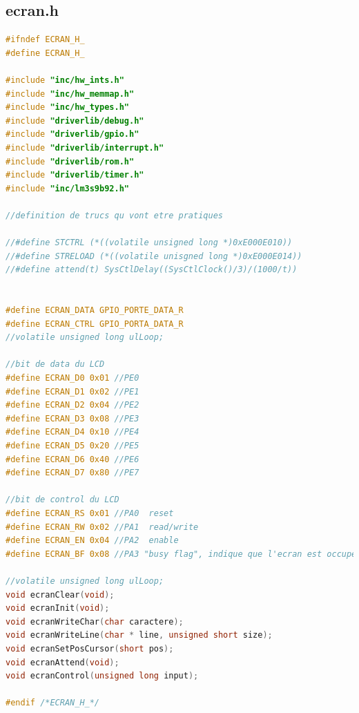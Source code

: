 \subsection{ecran.h}
\begin{lstlisting}[language=C]
#ifndef ECRAN_H_
#define ECRAN_H_

#include "inc/hw_ints.h"
#include "inc/hw_memmap.h"
#include "inc/hw_types.h"
#include "driverlib/debug.h"
#include "driverlib/gpio.h"
#include "driverlib/interrupt.h"
#include "driverlib/rom.h"
#include "driverlib/timer.h"
#include "inc/lm3s9b92.h"

//definition de trucs qu vont etre pratiques

//#define STCTRL (*((volatile unsigned long *)0xE000E010))
//#define STRELOAD (*((volatile unisgned long *)0xE000E014))
//#define attend(t) SysCtlDelay((SysCtlClock()/3)/(1000/t))


#define ECRAN_DATA GPIO_PORTE_DATA_R
#define ECRAN_CTRL GPIO_PORTA_DATA_R
//volatile unsigned long ulLoop;
	
//bit de data du LCD
#define ECRAN_D0 0x01 //PE0
#define ECRAN_D1 0x02 //PE1
#define ECRAN_D2 0x04 //PE2
#define ECRAN_D3 0x08 //PE3 
#define ECRAN_D4 0x10 //PE4
#define ECRAN_D5 0x20 //PE5
#define ECRAN_D6 0x40 //PE6
#define ECRAN_D7 0x80 //PE7

//bit de control du LCD
#define ECRAN_RS 0x01 //PA0  reset
#define ECRAN_RW 0x02 //PA1  read/write
#define ECRAN_EN 0x04 //PA2  enable
#define ECRAN_BF 0x08 //PA3 "busy flag", indique que l'ecran est occupe

//volatile unsigned long ulLoop;
void ecranClear(void);
void ecranInit(void);
void ecranWriteChar(char caractere);
void ecranWriteLine(char * line, unsigned short size);
void ecranSetPosCursor(short pos);
void ecranAttend(void);
void ecranControl(unsigned long input);

#endif /*ECRAN_H_*/

\end{lstlisting}

